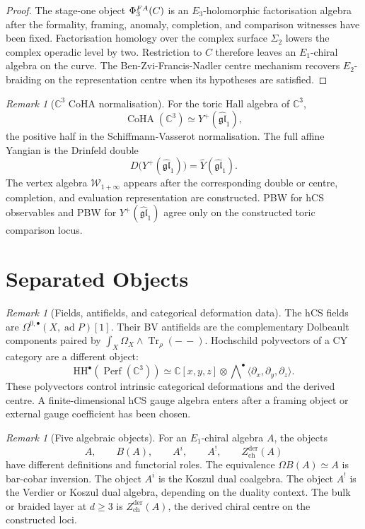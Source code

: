 \documentclass[11pt]{article}
\providecommand{\C}{\mathbb{C}}
\providecommand{\Tr}{\operatorname{Tr}}
\providecommand{\CoHA}{\operatorname{CoHA}}
\providecommand{\cW}{\mathcal{W}}
\providecommand{\PhiFA}{\Phi^{\mathrm{FA}}}
\providecommand{\Yp}{Y^+}
\providecommand{\Zchder}{Z^{\mathrm{der}}_{\mathrm{ch}}}
\theoremstyle{plain}
\theoremstyle{definition}
\theoremstyle{remark}
\newtheorem{remark}[theorem]{Remark}
\begin{document}
\begin{proof}
The stage-one object \(\PhiFA_3(\cC)\) is an \(E_3\)-holomorphic
factorisation algebra after the formality, framing, anomaly,
completion, and comparison witnesses have been fixed. Factorisation
homology over the complex surface \(\Sigma_2\) lowers the complex
operadic level by two. Restriction to \(C\) therefore leaves an
\(E_1\)-chiral algebra on the curve. The Ben-Zvi-Francis-Nadler
centre mechanism recovers \(E_2\)-braiding on the representation
centre when its hypotheses are satisfied.
\end{proof}

\begin{remark}[\(\C^3\) CoHA normalisation]
\label{rem:c3-coha}
For the toric Hall algebra of \(\C^3\),
\[
  \CoHA(\C^3)\simeq \Yp(\widehat{\mathfrak{gl}}_1),
\]
the positive half in the Schiffmann-Vasserot normalisation. The full
affine Yangian is the Drinfeld double
\[
  D\bigl(\Yp(\widehat{\mathfrak{gl}}_1)\bigr)
  =
  \widehat Y(\widehat{\mathfrak{gl}}_1).
\]
The vertex algebra \(\cW_{1+\infty}\) appears after the corresponding
double or centre, completion, and evaluation representation are
constructed. PBW for hCS observables and PBW for
\(\Yp(\widehat{\mathfrak{gl}}_1)\) agree only on the constructed toric
comparison locus.
\end{remark}

\section{Separated Objects}
\label{sec:separated-objects}

\begin{remark}[Fields, antifields, and categorical deformation data]
\label{rem:fields-vs-polyvectors}
The hCS fields are \(\Omega^{0,\bullet}(X,\operatorname{ad}P)[1]\).
Their BV antifields are the complementary Dolbeault components paired
by \(\int_X\Omega_X\wedge\Tr_\rho(-\, -)\). Hochschild polyvectors of
a CY category are a different object:
\[
  \mathrm{HH}^\bullet(\operatorname{Perf}(\C^3))
  \simeq
  \C[x,y,z]\otimes
  \bigwedge\nolimits^\bullet
  \langle\partial_x,\partial_y,\partial_z\rangle.
\]
These polyvectors control intrinsic categorical deformations and the
derived centre. A finite-dimensional hCS gauge algebra enters after a
framing object or external gauge coefficient has been chosen.
\end{remark}

\begin{remark}[Five algebraic objects]
\label{rem:five-objects}
For an \(E_1\)-chiral algebra \(A\), the objects
\[
  A,\qquad B(A),\qquad A^i,\qquad A^!,\qquad \Zchder(A)
\]
have different definitions and functorial roles. The equivalence
\(\Omega B(A)\simeq A\) is bar-cobar inversion. The object \(A^i\) is
the Koszul dual coalgebra. The object \(A^!\) is the Verdier or
Koszul dual algebra, depending on the duality context. The bulk or
braided layer at \(d\geq3\) is \(\Zchder(A)\), the derived chiral
centre on the constructed loci.
\end{remark}
\end{document}
